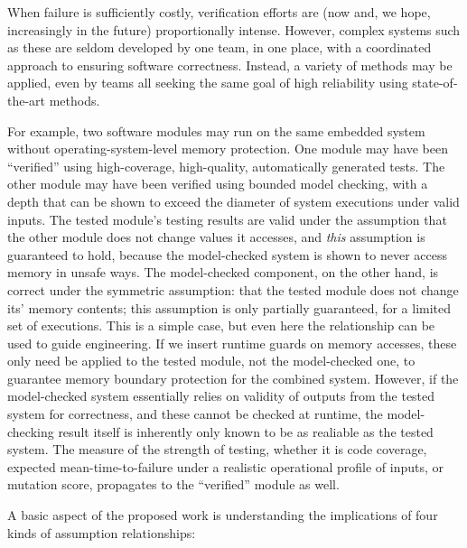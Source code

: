 When failure is sufficiently costly, verification efforts are (now
and, we hope, increasingly in the future) proportionally intense.
However, complex systems such as these are seldom developed by one
team, in one place, with a coordinated approach to ensuring software
correctness.  Instead, a variety of methods may be applied, even by
teams all seeking the same goal of high reliability using
state-of-the-art methods.  

For example, two software modules may run on the same embedded system
without operating-system-level memory protection.  One module may have been ``verified''
using high-coverage, high-quality, automatically generated tests.  The
other module may have been verified using bounded model checking, with
a depth that can be shown to exceed the diameter of system executions
under valid inputs.  The tested module's testing results are valid under the assumption that the other
module does not change values it accesses, and
\emph{this} assumption is guaranteed to hold, because the
model-checked system is shown to never access memory in unsafe ways.  The model-checked
component, on the other hand, is correct under the symmetric assumption: that
the tested module does not change its' memory contents; this assumption
is only partially guaranteed, for a limited set of executions.  This
is a simple case, but even here the relationship can be used to guide
engineering.  If we insert runtime guards on memory accesses, these
only need be applied to the tested module, not the model-checked one, to guarantee memory
boundary protection for the combined system.  However, if the
model-checked system essentially relies on validity of outputs from the tested system for
correctness, and these cannot be checked at runtime, the
model-checking result itself is inherently only known to be as
realiable as the tested system.  The measure of the strength of
testing, whether it is code coverage, expected mean-time-to-failure
under a realistic operational profile of inputs, or mutation score,
propagates to the ``verified'' module as well.

A basic aspect of the proposed work is understanding the implications
of four kinds of assumption relationships:

